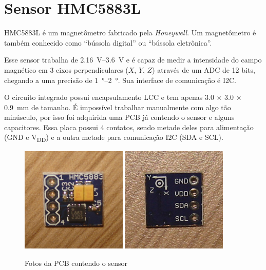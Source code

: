 \documentclass[brazil,pagestart=firstchapter]{abnt}
\newcommand{\VDD}{V\textsubscript{DD}\xspace}
\newcommand{\GND}{GND\xspace}
\begin{document}
\section{Sensor HMC5883L\label{sec:sensor}}

HMC5883L é um magnetômetro fabricado pela \textit{Honeywell}. Um
magnetômetro é também conhecido como ``bússola digital'' ou ``bússola
eletrônica''.

Esse sensor trabalha de \SIrange{2.16}{3.6}{\volt} e é capaz de medir a
intensidade do campo magnético em 3 eixos perpendiculares ($X$, $Y$, $Z$)
através de um \ac{ADC} de 12 bits, chegando a uma precisão de
\SIrange{1}{2}{\degree}. Sua interface de comunicação é \ac{I2C}.
\cite{HMC5883L}

O circuito integrado possui encapsulamento \ac{LCC} e tem apenas
\num{3.0} × \num{3.0} × \SI{0.9}{\milli\metre} de tamanho. É impossível
trabalhar manualmente com algo tão minúsculo, por isso foi adquirida uma
\ac{PCB} já contendo o sensor e alguns capacitores. \cite{ebay_HMC5883L}
Essa placa possui 4 contatos, sendo metade deles para alimentação (\GND e
\VDD) e a outra metade para comunicação \ac{I2C} (SDA e SCL).

\begin{figure}[h]
\centering
\includegraphics[width=0.45\textwidth]{img/sensor_front.jpg}
\includegraphics[width=0.45\textwidth]{img/sensor_back.jpg}
\caption{Fotos da PCB contendo o sensor}
\label{fig:sensor_photos}
\end{figure}
\end{document}
